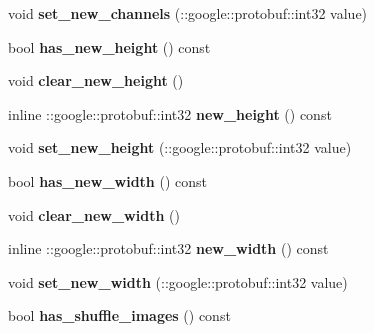 \begin{DoxyCompactItemize}
void {\bfseries set\+\_\+new\+\_\+channels} (\+::google\+::protobuf\+::int32 value)
\item 
\mbox{\label{classcaffe_1_1_v0_layer_parameter_a2ea52cc1e1f586f34b03c7ae2c0e45c7}} 
bool {\bfseries has\+\_\+new\+\_\+height} () const
\item 
\mbox{\label{classcaffe_1_1_v0_layer_parameter_adfa323fe2ec7a5063424bda676e975f9}} 
void {\bfseries clear\+\_\+new\+\_\+height} ()
\item 
\mbox{\label{classcaffe_1_1_v0_layer_parameter_a55fc55fe0893ae61aa5e3808abdf4437}} 
inline \+::google\+::protobuf\+::int32 {\bfseries new\+\_\+height} () const
\item 
\mbox{\label{classcaffe_1_1_v0_layer_parameter_acd5ceb79baa880142e5474e4a7afb9fb}} 
void {\bfseries set\+\_\+new\+\_\+height} (\+::google\+::protobuf\+::int32 value)
\item 
\mbox{\label{classcaffe_1_1_v0_layer_parameter_a6a80d2950b4e27615edf68984353b867}} 
bool {\bfseries has\+\_\+new\+\_\+width} () const
\item 
\mbox{\label{classcaffe_1_1_v0_layer_parameter_a20747631bf52243875d791eb4bc4b450}} 
void {\bfseries clear\+\_\+new\+\_\+width} ()
\item 
\mbox{\label{classcaffe_1_1_v0_layer_parameter_abc1ac307f9fb088a59c1a21f21beb2cf}} 
inline \+::google\+::protobuf\+::int32 {\bfseries new\+\_\+width} () const
\item 
\mbox{\label{classcaffe_1_1_v0_layer_parameter_a6a6ae62824e8e86c2d8411b012d7b3aa}} 
void {\bfseries set\+\_\+new\+\_\+width} (\+::google\+::protobuf\+::int32 value)
\item 
\mbox{\label{classcaffe_1_1_v0_layer_parameter_aff5f849001d03c4cd7108350e730dfba}} 
bool {\bfseries has\+\_\+shuffle\+\_\+images} () const
\item 

\end{DoxyCompactItemize}
